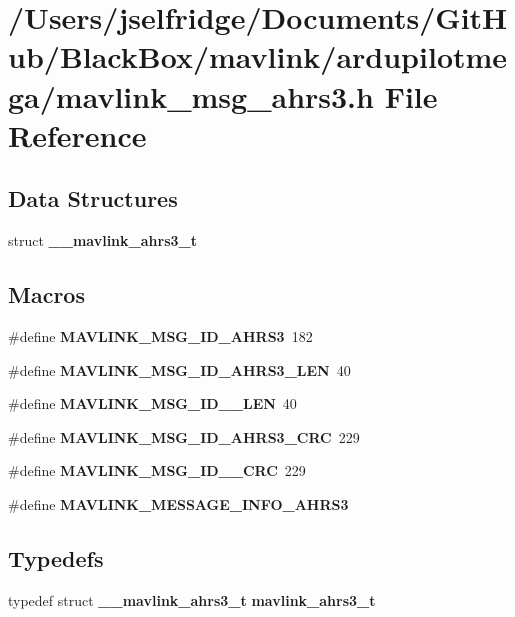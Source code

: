 \section{/\+Users/jselfridge/\+Documents/\+Git\+Hub/\+Black\+Box/mavlink/ardupilotmega/mavlink\+\_\+msg\+\_\+ahrs3.h File Reference}
\label{mavlink__msg__ahrs3_8h}
\subsection*{Data Structures}
\begin{DoxyCompactItemize}
\item 
struct \textbf{ \+\_\+\+\_\+mavlink\+\_\+ahrs3\+\_\+t}
\end{DoxyCompactItemize}
\subsection*{Macros}
\begin{DoxyCompactItemize}
\item 
\#define \textbf{ M\+A\+V\+L\+I\+N\+K\+\_\+\+M\+S\+G\+\_\+\+I\+D\+\_\+\+A\+H\+R\+S3}~182
\item 
\#define \textbf{ M\+A\+V\+L\+I\+N\+K\+\_\+\+M\+S\+G\+\_\+\+I\+D\+\_\+\+A\+H\+R\+S3\+\_\+\+L\+EN}~40
\item 
\#define \textbf{ M\+A\+V\+L\+I\+N\+K\+\_\+\+M\+S\+G\+\_\+\+I\+D\+\_\+\_\+\+L\+EN}~40
\item 
\#define \textbf{ M\+A\+V\+L\+I\+N\+K\+\_\+\+M\+S\+G\+\_\+\+I\+D\+\_\+\+A\+H\+R\+S3\+\_\+\+C\+RC}~229
\item 
\#define \textbf{ M\+A\+V\+L\+I\+N\+K\+\_\+\+M\+S\+G\+\_\+\+I\+D\+\_\+\_\+\+C\+RC}~229
\item 
\#define \textbf{ M\+A\+V\+L\+I\+N\+K\+\_\+\+M\+E\+S\+S\+A\+G\+E\+\_\+\+I\+N\+F\+O\+\_\+\+A\+H\+R\+S3}
\end{DoxyCompactItemize}
\subsection*{Typedefs}
\begin{DoxyCompactItemize}
\item 
typedef struct \textbf{ \+\_\+\+\_\+mavlink\+\_\+ahrs3\+\_\+t} \textbf{ mavlink\+\_\+ahrs3\+\_\+t}
\end{DoxyCompactItemize}


